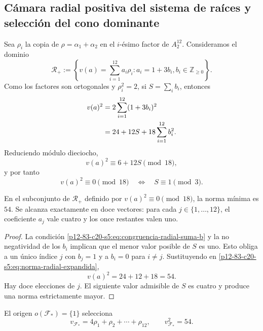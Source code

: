 \subsection{Cámara radial positiva del sistema de raíces y selección del cono dominante}

Sea \(\rho_i\) la copia de \(\rho=\alpha_1+\alpha_2\) en el
\(i\)-ésimo factor de \(A_2^{12}\). Consideramos el dominio
\begin{equation}
 \mathscr R_+
 :=\left\{
 v(a)=\sum_{i=1}^{12}a_i\rho_i:
 a_i=1+3b_i, b_i\in\mathbb Z_{\geq0}
 \right\}.
 \label{p12-83-c20-s5:eq:camara-radial-positiva}
\end{equation}
Como los factores son ortogonales y \(\rho_i^2=2\), si
\(S=\sum_i b_i\), entonces
\begin{align}
 v(a)^2
 &=2\sum_{i=1}^{12}(1+3b_i)^2\notag\\
 &=24+12S+18\sum_{i=1}^{12}b_i^2.
 \label{p12-83-c20-s5:eq:norma-radial-expandida}
\end{align}
Reduciendo módulo dieciocho,
\[
 v(a)^2\equiv6+12S\pmod{18},
\]
y por tanto
\begin{equation}
 v(a)^2\equiv0\pmod{18}
 \quad\Longleftrightarrow\quad
 S\equiv1\pmod3.
 \label{p12-83-c20-s5:eq:congruencia-radial-suma-b}
\end{equation}

\begin{proposition}
\label{p12-83-c20-s5:prop:minimos-camara-radial}
En el subconjunto de \(\mathscr R_+\) definido por
\(v(a)^2\equiv0\pmod{18}\), la norma mínima es \(54\). Se alcanza
exactamente en doce vectores: para cada \(j\in\{1,\ldots,12\}\), el
coeficiente \(a_j\) vale cuatro y los once restantes valen uno.
\end{proposition}

\begin{proof}
La condición \eqref{p12-83-c20-s5:eq:congruencia-radial-suma-b} y la no negatividad de
los \(b_i\) implican que el menor valor posible de \(S\) es uno. Esto
obliga a un único índice \(j\) con \(b_j=1\) y a \(b_i=0\) para
\(i\neq j\). Sustituyendo en \eqref{p12-83-c20-s5:eq:norma-radial-expandida},
\[
 v(a)^2=24+12+18=54.
\]
Hay doce elecciones de \(j\). El siguiente valor admisible de \(S\) es
cuatro y produce una norma estrictamente mayor.
\end{proof}

El origen \(o(\mathcal F_*)=\{1\}\) selecciona
\begin{equation}
 \boxed{
 v_{\mathcal F_*}
 =4\rho_1+\rho_2+\cdots+\rho_{12},
 \qquad
 v_{\mathcal F_*}^2=54.}
 \label{p12-83-c20-s5:eq:vector-marco-incidencial}
\end{equation}

